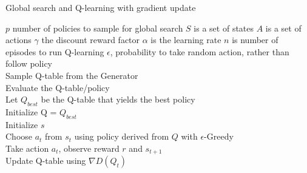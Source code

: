 \begin{algorithm}[H]
\caption{Global search and Q-learning with gradient update}
\begin{algorithmic}[1]
\Require
	\State $p$ number of policies to sample for global search
 	\State $S$ is a set of states
 	\State $A$ is a set of actions
 	\State $\gamma$ the discount reward factor
 	\State $\alpha$ is the learning rate
 	\State $n$ is number of episodes to run Q-learning
 	\State $\epsilon$, probability to take random action, rather than follow policy
 {}
\\ \qquad Sample Q-table from the Generator
\\ \qquad Evaluate the Q-table/policy
\EndFor
\\ Let $Q_{best}$ be the Q-table that yields the best policy
\EndProcedure
{} {}
\\Initialize Q = $Q_{best}$
\\ \qquad Initialize $s$
\\ \qquad \qquad Choose $a_t$ from $s_t$ using policy derived from $Q$ with $\epsilon$-Greedy
\\ \qquad \qquad Take action $a_t$, observe reward $r$ and $s_{t+1}$
\\ \qquad \qquad Update Q-table using $\nabla D(Q_{t})$
\EndFor
\EndFor
\EndProcedure
\end{algorithmic}
\end{algorithm}


